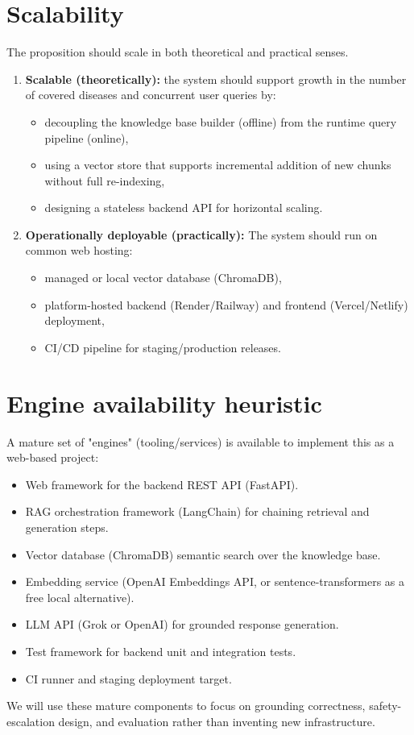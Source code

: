 \documentclass[11pt,a4paper]{article}
\begin{document}
\section{Scalability}
The proposition should scale in both theoretical and practical senses.
\begin{enumerate}
    \item \textbf{Scalable (theoretically):} the system should support growth in the number of covered diseases and concurrent user queries by:
    \begin{itemize}
        \item decoupling the knowledge base builder (offline) from the runtime query pipeline (online),
        \item using a vector store that supports incremental addition of new chunks without full re-indexing,
        \item designing a stateless backend API for horizontal scaling.
    \end{itemize}
    \item \textbf{Operationally deployable (practically):} The system should run on common web hosting:
    \begin{itemize}
        \item managed or local vector database (ChromaDB),
        \item platform-hosted backend (Render/Railway) and frontend (Vercel/Netlify) deployment,
        \item CI/CD pipeline for staging/production releases.
    \end{itemize}
\end{enumerate}

\section{Engine availability heuristic}
A mature set of "engines" (tooling/services) is available to implement this as a web-based project:
\begin{itemize}
    \item Web framework for the backend REST API (FastAPI).
    \item RAG orchestration framework (LangChain) for chaining retrieval and generation steps.
    \item Vector database (ChromaDB) semantic search over the knowledge base.
    \item Embedding service (OpenAI Embeddings API, or sentence-transformers as a free local alternative).
    \item LLM API (Grok or OpenAI) for grounded response generation.
    \item Test framework for backend unit and integration tests.
    \item CI runner and staging deployment target.
\end{itemize}
We will use these mature components to focus on grounding correctness, safety-escalation design, and evaluation rather than inventing new infrastructure.
\end{document}

